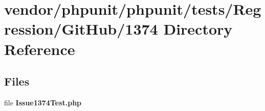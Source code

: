 \section{vendor/phpunit/phpunit/tests/\+Regression/\+Git\+Hub/1374 Directory Reference}
\label{dir_d071fd7d0aebd7ee4437e2eb44735679}
\subsection*{Files}
\begin{DoxyCompactItemize}
\item 
file {\bf Issue1374\+Test.\+php}
\end{DoxyCompactItemize}
